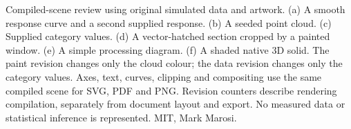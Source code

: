 \caption{Compiled-scene review using original simulated data and artwork. (a) A smooth response curve and a second supplied response. (b) A seeded point cloud. (c) Supplied category values. (d) A vector-hatched section cropped by a painted window. (e) A simple processing diagram. (f) A shaded native 3D solid. The paint revision changes only the cloud colour; the data revision changes only the category values. Axes, text, curves, clipping and compositing use the same compiled scene for SVG, PDF and PNG. Revision counters describe rendering compilation, separately from document layout and export. No measured data or statistical inference is represented. MIT, Mark Marosi.}
